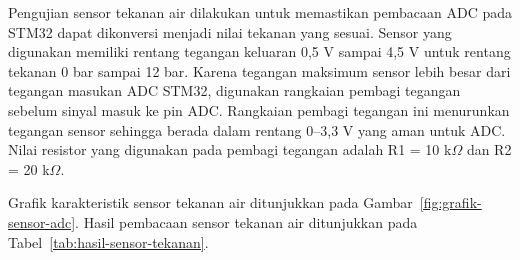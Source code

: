 Pengujian sensor tekanan air dilakukan untuk memastikan pembacaan ADC pada
STM32 dapat dikonversi menjadi nilai tekanan yang sesuai. Sensor yang digunakan
memiliki rentang tegangan keluaran 0,5 V sampai 4,5 V untuk rentang tekanan
0 bar sampai 12 bar. Karena tegangan maksimum sensor lebih besar dari tegangan
masukan ADC STM32, digunakan rangkaian pembagi tegangan sebelum sinyal masuk
ke pin ADC. Rangkaian pembagi tegangan ini menurunkan tegangan sensor sehingga 
berada dalam rentang 0--3,3 V yang aman untuk ADC.
Nilai resistor yang digunakan pada pembagi tegangan adalah R1 = 10 k$\Omega$ dan R2 = 20 k$\Omega$.

Grafik karakteristik sensor tekanan air ditunjukkan pada Gambar~\ref{fig:grafik-sensor-adc}.
Hasil pembacaan sensor tekanan air ditunjukkan pada Tabel~\ref{tab:hasil-sensor-tekanan}.

